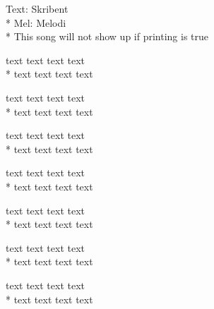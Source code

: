 \begin{SongText}[OnlineSong]
    \begin{SongInfo}
        Text: Skribent\\*%
        Mel: Melodi\\*%
        This song will not show up if printing is true
    \end{SongInfo}
    \begin{SongVerse}
        text text text text\\*%
        text text text text 
    \end{SongVerse}
    \begin{SongVerse}
        text text text text\\*%
        text text text text 
    \end{SongVerse}
    \begin{SongVerse}
        text text text text\\*%
        text text text text 
    \end{SongVerse}
    \begin{SongVerse}
        text text text text\\*%
        text text text text 
    \end{SongVerse}
    \begin{SongVerse}
        text text text text\\*%
        text text text text 
    \end{SongVerse}
    \begin{SongVerse}
        text text text text\\*%
        text text text text 
    \end{SongVerse}
    \begin{SongVerse}
        text text text text\\*%
        text text text text 
    \end{SongVerse}
\end{SongText}